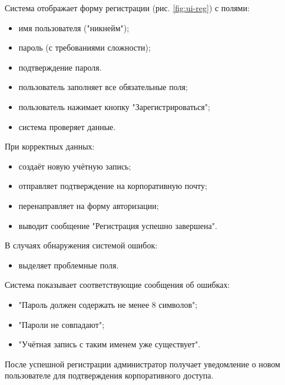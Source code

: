 Система отображает форму регистрации (рис. \ref{fig:ui-reg}) с полями:  

\begin{itemize}  
	\item имя пользователя ("никнейм");  
	\item пароль (с требованиями сложности);  
	\item подтверждение пароля.
\end{itemize}



\begin{itemize}
	\item пользователь заполняет все обязательные поля;  
	\item пользователь нажимает кнопку "Зарегистрироваться";  
	\item система проверяет данные.
\end{itemize}

При корректных данных: 

\begin{itemize}  
	\item создаёт новую учётную запись;  
	\item отправляет подтверждение на корпоративную почту;  
	\item перенаправляет на форму авторизации;  
	\item выводит сообщение "Регистрация успешно завершена".
\end{itemize}

В случаях обнаружения системой ошибок:

\begin{itemize}
	\item выделяет проблемные поля.
\end{itemize}

Система показывает соответствующие сообщения об ошибках:  

\begin{itemize}
	\item "Пароль должен содержать не менее 8 символов";  
	\item "Пароли не совпадают";  
	\item "Учётная запись с таким именем уже существует".   
\end{itemize}

После успешной регистрации администратор получает уведомление о новом пользователе для подтверждения корпоративного доступа. 

